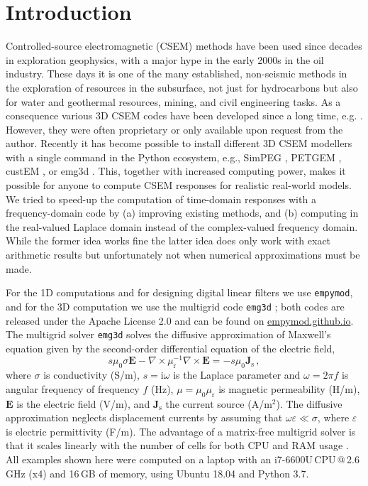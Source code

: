 \documentclass{eage2020}
\newcommand{\mr}[1]{\mathrm{#1}}
\newcommand{\emg}[2]{\texttt{emg#1#2}\xspace}
\newcommand{\empymod}{\texttt{empymod}\xspace}
\begin{document}
\section{Introduction}

Controlled-source electromagnetic (CSEM) methods have been used since decades
in exploration geophysics, with a major hype in the early 2000s in the oil
industry. These days it is one of the many established, non-seismic methods in
the exploration of resources in the subsurface, not just for hydrocarbons but
also for water and geothermal resources, mining, and civil engineering tasks.
As a consequence various 3D CSEM codes have been developed since a long time,
e.g. \cite{B.SEG.99.Oristaglio}. However, they were often proprietary or only
available upon request from the author. Recently it has become possible to
install different 3D CSEM modellers with a single command in the Python
ecosystem, e.g., SimPEG \citep{SimPEG}, PETGEM \citep{PETGEM}, custEM
\citep{custEM}, or emg3d \citep{JOSS.19.Werthmuller}. This, together with
increased computing power, makes it possible for anyone to compute CSEM
responses for realistic real-world models. We tried to speed-up the computation
of time-domain responses with a frequency-domain code by (a) improving existing
methods, and (b) computing in the real-valued Laplace domain instead of the
complex-valued frequency domain. While the former idea works fine the latter
idea does only work with exact arithmetic results but unfortunately not when
numerical approximations must be made.

For the 1D computations and for designing digital linear filters we use
\empymod \citep{GEO.17.Werthmuller}, and for the 3D computation we use the
multigrid code \emg3d \citep{JOSS.19.Werthmuller}; both codes are released
under the Apache License 2.0 and can be found on
\href{https://empymod.github.io}{empymod.github.io}. The multigrid solver
\emg3d solves the diffusive approximation of Maxwell's equation given by the
second-order differential equation of the electric field,
%
\begin{equation}
    s\mu_0 \sigma \mathbf{E} -
    \nabla \times \mu_\mr{r}^{-1} \nabla \times \mathbf{E}
    = -s\mu_0 \mathbf{J}_\mathrm{s} \, ,
  \label{eq:maxwell}
\end{equation}
%
where $\sigma$ is conductivity (S/m), $s=\mr{i}\omega$ is the Laplace parameter
and $\omega=2\pi f$ is angular frequency of frequency $f$ (Hz),
$\mu=\mu_0\mu_\mr{r}$ is magnetic permeability (H/m), $\mathbf{E}$ is the
electric field (V/m), and $\mathbf{J}_\mathrm{s}$ the current source (A/m$^2$).
The diffusive approximation neglects displacement currents by assuming that
$\omega\varepsilon \ll \sigma$, where $\varepsilon$ is electric permittivity
(F/m). The advantage of a matrix-free multigrid solver is that it scales
linearly with the number of cells for both CPU and RAM usage
\citep{B.Springer.11.Mulder}. All examples shown here were computed on a laptop
with an i7-6600U\,CPU\,@\,2.6\,GHz (x4) and 16\,GB of memory, using Ubuntu
18.04 and Python 3.7.
\end{document}
